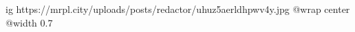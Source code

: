  
 
 
 
 

\ifcmt
  ig https://mrpl.city/uploads/posts/redactor/uhuz5aerldhpwv4y.jpg
  @wrap center
  @width 0.7
\fi
